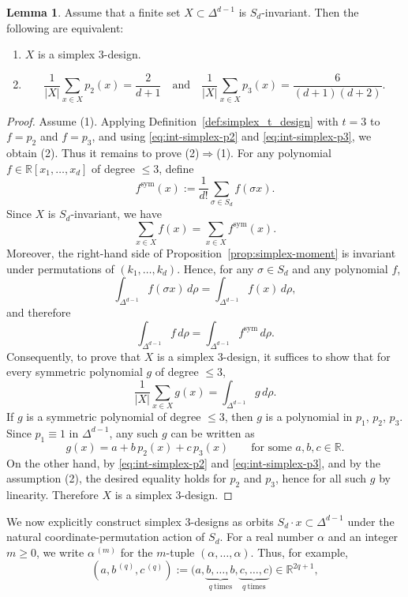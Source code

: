\documentclass{amsart}
\theoremstyle{definition}
\newtheorem{lemma}[theorem]{Lemma}
\theoremstyle{remark}
\numberwithin{equation}{section}
\newcommand{\R}{{\mathbb R}}
\begin{document}
\begin{lemma}\label{lem:sd-inv-simplex3}
Assume that a finite set $X\subset\Delta^{d-1}$ is $S_d$-invariant.
Then the following are equivalent:
\begin{enumerate}
\item $X$ is a simplex $3$-design.
\item \[
\frac1{|X|}\sum_{x\in X} p_2(x)=\frac{2}{d+1}
\quad\text{and}\quad
\frac1{|X|}\sum_{x\in X} p_3(x)=\frac{6}{(d+1)(d+2)}.
\]
\end{enumerate}
\end{lemma}

\begin{proof}
Assume (1).
Applying Definition~\ref{def:simplex_t_design} with $t=3$ to $f=p_2$ and $f=p_3$, and using
\eqref{eq:int-simplex-p2} and \eqref{eq:int-simplex-p3}, we obtain (2).
Thus it remains to prove (2)$\Rightarrow$(1).
For any polynomial $f\in\R[x_1,\dots,x_d]$ of degree $\le3$, define
\[
f^{\mathrm{sym}}(x):=\frac1{d!}\sum_{\sigma\in S_d} f(\sigma x).
\]
Since $X$ is $S_d$-invariant, we have
\[
\sum_{x\in X} f(x)=\sum_{x\in X} f^{\mathrm{sym}}(x).
\]
Moreover, the right-hand side of Proposition~\ref{prop:simplex-moment} is invariant under permutations of $(k_1,\dots,k_d)$.
Hence, for any $\sigma\in S_d$ and any polynomial $f$,
\[
\int_{\Delta^{d-1}} f(\sigma x)\,d\rho=\int_{\Delta^{d-1}} f(x)\,d\rho,
\]
and therefore
\[
\int_{\Delta^{d-1}} f\,d\rho=\int_{\Delta^{d-1}} f^{\mathrm{sym}}\,d\rho.
\]
Consequently, to prove that $X$ is a simplex $3$-design, it suffices to show that for every symmetric polynomial $g$ of degree $\le 3$,
\[
\frac1{|X|}\sum_{x\in X} g(x)=\int_{\Delta^{d-1}} g\,d\rho.
\]
If $g$ is a symmetric polynomial of degree $\le3$, then $g$ is a polynomial in $p_1$, $p_2$, $p_3$.
Since $p_1\equiv1$ in $\Delta^{d-1}$, any such $g$ can be written as
\[
g(x)=a+b\,p_2(x)+c\,p_3(x)\qquad
\text{for some }a,b,c\in\R.
\]
On the other hand, by \eqref{eq:int-simplex-p2} and \eqref{eq:int-simplex-p3}, and by the assumption (2),
the desired equality holds for $p_2$ and $p_3$, hence for all such $g$ by linearity.
Therefore $X$ is a simplex $3$-design.
\end{proof}
We now explicitly construct simplex $3$-designs as orbits $S_d\cdot x\subset\Delta^{d-1}$ under the natural coordinate-permutation action of $S_d$.
For a real number $\alpha$ and an integer $m\ge0$, we write $\alpha^{\,(m)}$ for the $m$-tuple $(\alpha,\dots,\alpha)$.
Thus, for example,
\[
(a,b^{\,(q)},c^{\,(q)})
:=
\bigl(a,\underbrace{b,\ldots,b}_{q\ \text{times}},\underbrace{c,\ldots,c}_{q\ \text{times}}\bigr)\in\R^{2q+1},
\]
\end{document}
